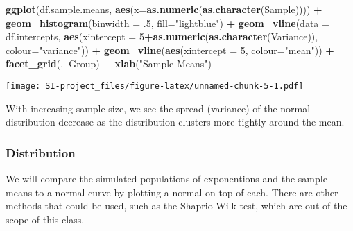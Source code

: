 \documentclass[]{article}
\newenvironment{Shaded}{\begin{snugshade}}{\end{snugshade}}
\newcommand{\KeywordTok}[1]{\textcolor[rgb]{0.13,0.29,0.53}{\textbf{#1}}}
\newcommand{\DataTypeTok}[1]{\textcolor[rgb]{0.13,0.29,0.53}{#1}}
\newcommand{\DecValTok}[1]{\textcolor[rgb]{0.00,0.00,0.81}{#1}}
\newcommand{\StringTok}[1]{\textcolor[rgb]{0.31,0.60,0.02}{#1}}
\newcommand{\OperatorTok}[1]{\textcolor[rgb]{0.81,0.36,0.00}{\textbf{#1}}}
\newcommand{\NormalTok}[1]{#1}
\begin{document}
\begin{Shaded}
\begin{Highlighting}[]
\KeywordTok{ggplot}\NormalTok{(df.sample.means, }\KeywordTok{aes}\NormalTok{(}\DataTypeTok{x=}\KeywordTok{as.numeric}\NormalTok{(}\KeywordTok{as.character}\NormalTok{(Sample)))) }\OperatorTok{+}\StringTok{ }
\StringTok{  }\KeywordTok{geom_histogram}\NormalTok{(}\DataTypeTok{binwidth =}\NormalTok{ .}\DecValTok{5}\NormalTok{, }\DataTypeTok{fill=}\StringTok{"lightblue"}\NormalTok{) }\OperatorTok{+}
\StringTok{  }\KeywordTok{geom_vline}\NormalTok{(}\DataTypeTok{data =}\NormalTok{ df.intercepts, }\KeywordTok{aes}\NormalTok{(}\DataTypeTok{xintercept =} \DecValTok{5}\OperatorTok{+}\KeywordTok{as.numeric}\NormalTok{(}\KeywordTok{as.character}\NormalTok{(Variance)), }\DataTypeTok{colour=}\StringTok{"variance"}\NormalTok{)) }\OperatorTok{+}
\StringTok{  }\KeywordTok{geom_vline}\NormalTok{(}\KeywordTok{aes}\NormalTok{(}\DataTypeTok{xintercept =} \DecValTok{5}\NormalTok{, }\DataTypeTok{colour=}\StringTok{"mean"}\NormalTok{)) }\OperatorTok{+}
\StringTok{  }\KeywordTok{facet_grid}\NormalTok{(.}\OperatorTok{~}\NormalTok{Group) }\OperatorTok{+}
\StringTok{  }\KeywordTok{xlab}\NormalTok{(}\StringTok{"Sample Means"}\NormalTok{)}
\end{Highlighting}
\end{Shaded}

\texttt{[image: SI-project\_files/figure-latex/unnamed-chunk-5-1.pdf]}

With increasing sample size, we see the spread (variance) of the normal
distribution decrease as the distribution clusters more tightly around
the mean.

\subsubsection{Distribution}\label{distribution}

We will compare the simulated populations of exponentions and the sample
means to a normal curve by plotting a normal on top of each. There are
other methods that could be used, such as the Shaprio-Wilk test, which
are out of the scope of this class.
\end{document}
